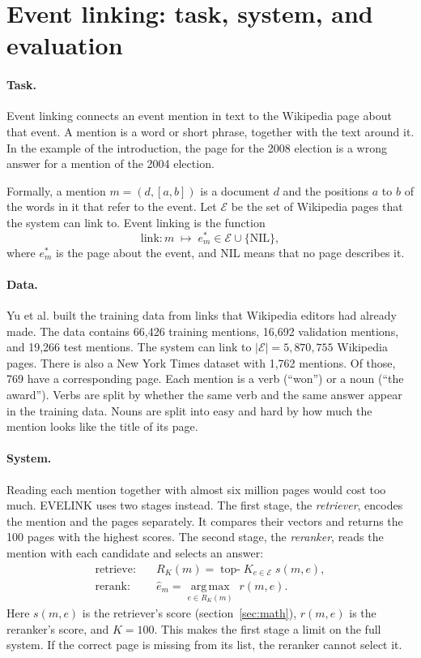 \documentclass[11pt]{article}
\theoremstyle{definition}
\newcommand{\citeauthor}[1]{Yu et al.}
\begin{document}
\section{Event linking: task, system, and evaluation}
\label{sec:task}

\paragraph{Task.} Event linking connects an event mention in text to the Wikipedia page about that event. A mention is a word or short phrase, together with the text around it. In the example of the introduction, the page for the 2008 election is a wrong answer for a mention of the 2004 election.

Formally, a mention $m = (d, [a, b])$ is a document $d$ and the positions $a$ to $b$ of the words in it that refer to the event. Let $\mathcal{E}$ be the set of Wikipedia pages that the system can link to. Event linking is the function
\begin{equation}
  \mathrm{link}: m \;\longmapsto\; e^{*}_m \in \mathcal{E} \cup \{\mathrm{NIL}\},
  \label{eq:task}
\end{equation}
where $e^{*}_m$ is the page about the event, and NIL means that no page describes it.

\paragraph{Data.} \citeauthor{yu2023event} built the training data from links that Wikipedia editors had already made. The data contains 66,426 training mentions, 16,692 validation mentions, and 19,266 test mentions. The system can link to $|\mathcal{E}| = 5{,}870{,}755$ Wikipedia pages. There is also a New York Times dataset with 1,762 mentions. Of those, 769 have a corresponding page. Each mention is a verb (``won'') or a noun (``the award''). Verbs are split by whether the same verb and the same answer appear in the training data. Nouns are split into easy and hard by how much the mention looks like the title of its page.

\paragraph{System.} Reading each mention together with almost six million pages would cost too much. EVELINK uses two stages instead. The first stage, the \emph{retriever}, encodes the mention and the pages separately. It compares their vectors and returns the 100 pages with the highest scores. The second stage, the \emph{reranker}, reads the mention with each candidate and selects an answer:
\begin{align}
  \text{retrieve:}\quad & R_K(m) = \operatorname*{top-}K_{e \in \mathcal{E}}\; s(m, e), \label{eq:retrieve}\\
  \text{rerank:}\quad & \hat{e}_m = \operatorname*{arg\,max}_{e \in R_K(m)}\; r(m, e). \label{eq:rerank}
\end{align}
Here $s(m, e)$ is the retriever's score (section~\ref{sec:math}), $r(m, e)$ is the reranker's score, and $K = 100$. This makes the first stage a limit on the full system. If the correct page is missing from its list, the reranker cannot select it.
\end{document}
